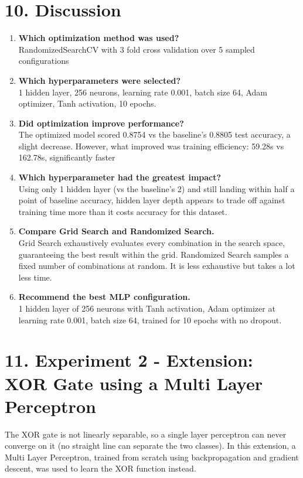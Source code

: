 \documentclass[11pt]{article}
\begin{document}
\section*{10. Discussion}
 
\begin{enumerate}
\item \textbf{Which optimization method was used?} \\
RandomizedSearchCV with 3 fold cross validation over 5 sampled configurations
\item \textbf{Which hyperparameters were selected?} \\
1 hidden layer, 256 neurons, learning rate 0.001, batch size 64, Adam optimizer, Tanh activation, 10 epochs.
\item \textbf{Did optimization improve performance?} \\
The optimized model scored 0.8754 vs the baseline's 0.8805 test accuracy, a slight decrease. However, what improved was training efficiency: 59.28s vs 162.78s, significantly faster
\item \textbf{Which hyperparameter had the greatest impact?} \\
Using only 1 hidden layer (vs the baseline's 2) and still landing within half a point of baseline accuracy, hidden layer depth appears to trade off against training time more than it costs accuracy for this dataset.
\item \textbf{Compare Grid Search and Randomized Search.} \\
Grid Search exhaustively evaluates every combination in the search space, guaranteeing the best result within the grid. Randomized Search samples a fixed number of combinations at random. It is less exhaustive but takes a lot less time.
\item \textbf{Recommend the best MLP configuration.} \\
1 hidden layer of 256 neurons with Tanh activation, Adam optimizer at learning rate 0.001, batch size 64, trained for 10 epochs with no dropout.
\end{enumerate}



\section*{11. Experiment 2 - Extension: XOR Gate using a Multi Layer Perceptron}

The XOR gate is not linearly separable, so a single layer perceptron can never converge on it (no straight line can separate the two classes). In this extension, a Multi Layer Perceptron, trained from scratch using backpropagation and gradient descent, was used to learn the XOR function instead.
\end{document}
